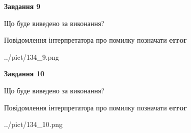 \documentclass[12pt, ukrainian]{article}
\begin{document}
{{\begin {center}\textbf{Завдання 9}\end {center}}\par
Що буде виведено за виконання? \par
Повідомлення інтерпретатора про помилку позначати \textbf{error}

\begin{center}
	{../pict/134_9.png}
\end{center}
\newpage

{\begin {center}\textbf{Завдання 10}\end {center}}\par
Що буде виведено за виконання? \par
Повідомлення інтерпретатора про помилку позначати \textbf{error}

\begin{center}
	{../pict/134_10.png}
\end{center}
\newpage

}
\end{document}
